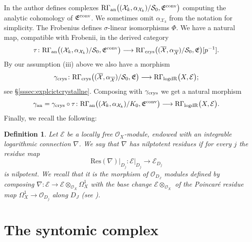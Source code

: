 \documentclass[asterisque,english]{smfart}
\newtheorem{definition}{Definition}[]
\begin{document}
In \cite[Def. 2.2.12]{Shiho} the author defines complexes $\mathrm{R}\Gamma_{\mathrm{an}}\bigl((\mathcal{X}_k,\alpha_{\mathcal{X}_k})/\mathcal{S}_0,\mathfrak{E}^{\rm conv}\bigr)$ computing the analytic cohomology of $\mathfrak{E}^{\rm conv}$. We sometimes omit $\alpha_{\mathcal{X}_k}$ from the notation for simplicity. The Frobenius defines $\sigma$-linear isomorphisms $\Phi$. We have a natural map, compatible with Frobenii, in the derived category
$$\tau\colon \mathrm{R}\Gamma_{\mathrm{an}}\bigl((\mathcal{X}_k,\alpha_{\mathcal{X}_k})/\mathcal{S}_0,\mathfrak{E}^{\rm conv}\bigr) \longrightarrow \mathrm{R}\Gamma_{\mathrm{crys}}\bigl((\overline{\mathcal{X}},\alpha_{\overline{\mathcal{X}}})/\mathcal{S}_0,\mathfrak{E}\bigr) [p^{-1}].$$By our assumption (iii) above we also have a morphism $$\gamma_{\rm crys}\colon  \mathrm{R}\Gamma_{\mathrm{crys}}\bigl((\overline{\mathcal{X}},\alpha_{\overline{\mathcal{X}}})/\mathcal{S}_0,\mathfrak{E}\bigr) \longrightarrow \mathrm{R}\Gamma_{\mathrm{logdR}}\bigl(X, \mathcal{E}\bigr);$$see \S \ref{sssec:explcictcrystallne}.  Composing with $\gamma_{\rm crys}$ we get a natural morphism 
$$\gamma_{\rm an}=\gamma_{\rm crys}\circ \tau \colon \mathrm{R}\Gamma_{\mathrm{an}}\bigl((\mathcal{X}_k,\alpha_{\mathcal{X}_k})/K_0,\mathfrak{E}^{\rm conv}\bigr) \longrightarrow  \mathrm{R}\Gamma_{\mathrm{logdR}}\bigl(X, \mathcal{E}\bigr).$$Finally, we recall the following:

\begin{definition}\label{def:nilpotentconnection} Let $\mathcal{E}$ be a locally free $\mathcal{O}_X$-module, endowed with an integrable logarithmic connection $\nabla$. We say that $\nabla$ has nilptotent residues if for every $j$ the residue map $$\mathrm{Res}(\nabla)\vert_{D_j}\colon \mathcal{E}\vert_{D_j}\longrightarrow \mathcal{E}_{D_j}$$is nilpotent. We recall that it is the morphism of $\mathcal{O}_{D_J}$ modules defined by composing $\nabla\colon \mathcal{E}\to \mathcal{E}\otimes_{\mathcal{O}_X} \Omega^1_X$    with the base change  $\mathcal{E}\otimes_{\mathcal{O}_X}$ of the Poincar\'e residue map $\Omega^1_X \to \mathcal{O}_{D_j}$ along $D_J$ (see \cite[Ex. 1.2.13 \& Prop. 1.2.14]{OgusBook}).

\end{definition}






\section{The syntomic complex}
\end{document}

